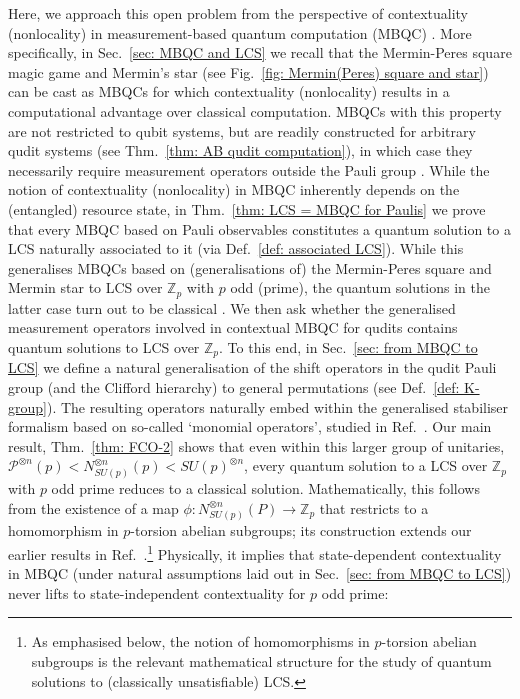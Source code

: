 \documentclass[aps,pra,letterpaper,onrcolumn,nofootinbib,notitlepage,longbibliography]{revtex4-1}
\newcommand{\mf}[1]{#1}
\newcommand{\ra}{\ensuremath{\rightarrow}}
\newcommand{\zz}{\mathbb Z}
\newcommand\mc[1]{\mathcal{#1}}
\newcommand{\cP}{\mc{P}}
\begin{document}
Here, we approach this open problem from the perspective of contextuality (nonlocality) in measurement-based quantum computation (MBQC) \cite{RaussendorfBriegel2001}. More specifically, in Sec.~\ref{sec: MBQC and LCS} we recall that the Mermin-Peres square magic game \cite{Mermin1990,Peres1991} and Mermin's star \cite{Mermin1993} (see Fig.~\ref{fig: Mermin(Peres) square and star}) can be cast as MBQCs for which contextuality (nonlocality) results in a computational advantage over classical computation. MBQCs with this property are not restricted to qubit systems, but are readily constructed for arbitrary qudit systems (see Thm.~\ref{thm: AB qudit computation}), in which case they necessarily require measurement operators outside the Pauli group \cite{FrembsRobertsCampbellBartlett2022}. While the notion of contextuality (nonlocality) in MBQC inherently depends on the (entangled) resource state, in Thm.~\ref{thm: LCS = MBQC for Paulis} we prove that every MBQC based on Pauli observables constitutes a quantum solution to a LCS naturally associated to it (via Def.~\ref{def: associated LCS}). While this generalises MBQCs based on (generalisations of) the Mermin-Peres square and Mermin star to LCS over $\zz_p$ with $p$ odd (prime), the quantum solutions in the latter case turn out to be classical \cite{QassimWallman2020}. We then ask whether the generalised measurement operators involved in contextual MBQC for qudits contains quantum solutions to LCS over $\zz_p$. To this end, in Sec.~\ref{sec: from MBQC to LCS} we define a natural generalisation of the shift operators in the qudit Pauli group (and the Clifford hierarchy) to general permutations (see Def.~\ref{def: K-group}). The resulting operators naturally embed within the generalised stabiliser formalism based on so-called `monomial operators', studied in Ref.~\cite{VanDenNest2011,vanDenNest2013}. Our main result, Thm.~\ref{thm: FCO-2} shows that even within this larger group of unitaries, $\cP^{\otimes n}(p)<N^{\otimes n}_{SU(p)}(p)<SU(p)^{\otimes n}$, every quantum solution to a LCS over $\zz_p$ with $p$ odd prime reduces to a classical solution. Mathematically, this follows from the existence of a map $\phi:N^{\otimes n}_{SU(p)}(P)\ra\zz_p$ that restricts to a homomorphism in $p$-torsion abelian subgroups; its construction extends our earlier results in Ref.~\cite{FrembsChungOkay2022}.\footnote{As emphasised below, the notion of homomorphisms in $p$-torsion abelian subgroups is the relevant mathematical structure for the study of quantum solutions to (classically unsatisfiable) LCS.} Physically, it implies that state-dependent contextuality in MBQC \mf{(under natural assumptions laid out in Sec.~\ref{sec: from MBQC to LCS})} never lifts to state-independent contextuality for $p$ odd prime:
\end{document}
